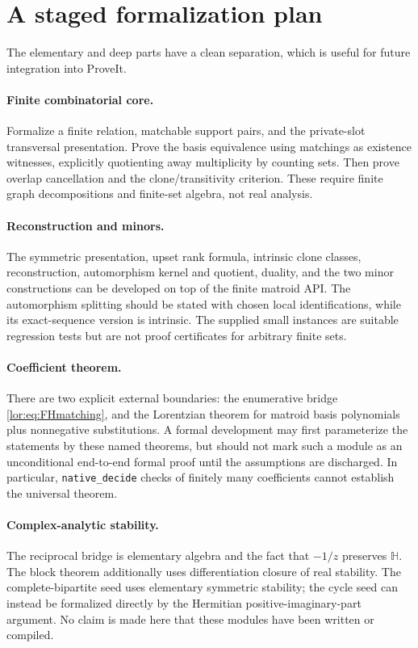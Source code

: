 \documentclass[11pt]{article}
\numberwithin{equation}{section}
\theoremstyle{definition}
\newcommand{\HH}{\mathbb H}
\begin{document}
\section{A staged formalization plan}
\label{mat:sec:formalization}
The elementary and deep parts have a clean separation, which is useful for
future integration into ProveIt.

\paragraph{Finite combinatorial core.}
Formalize a finite relation, matchable support pairs, and the private-slot
transversal presentation. Prove the basis equivalence using matchings as
existence witnesses, explicitly quotienting away multiplicity by counting
sets. Then prove overlap cancellation and the clone/transitivity
criterion. These require finite graph decompositions and finite-set
algebra, not real analysis.

\paragraph{Reconstruction and minors.}
The symmetric presentation, upset rank formula, intrinsic clone classes,
reconstruction, automorphism kernel and quotient, duality, and the two
minor constructions can be developed on top of the finite matroid API.
The automorphism splitting should be stated with chosen local
identifications, while its exact-sequence version is intrinsic.
The supplied small instances are suitable regression tests but are not
proof certificates for arbitrary finite sets.

\paragraph{Coefficient theorem.}
There are two explicit external boundaries: the enumerative bridge
\eqref{lor:eq:FHmatching}, and the Lorentzian theorem for matroid basis
polynomials plus nonnegative substitutions. A formal development may first
parameterize the statements by these named theorems, but should not mark
such a module as an unconditional end-to-end formal proof until the
assumptions are discharged. In particular, \texttt{native\_decide} checks
of finitely many coefficients cannot establish the universal theorem.

\paragraph{Complex-analytic stability.}
The reciprocal bridge is elementary algebra and the fact that $-1/z$
preserves $\HH$. The block theorem additionally uses differentiation
closure of real stability. The complete-bipartite seed uses elementary
symmetric stability; the cycle seed can instead be formalized directly by
the Hermitian positive-imaginary-part argument. No claim is made here that
these modules have been written or compiled.
\end{document}
